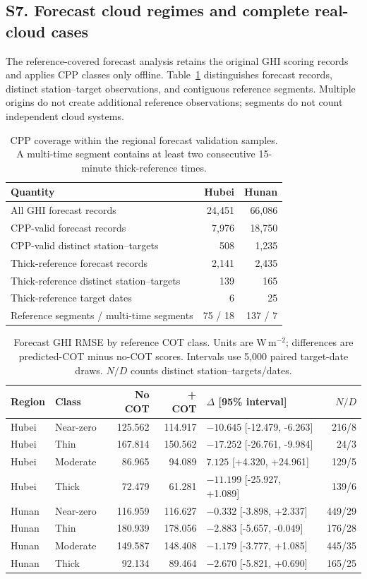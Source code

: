 \documentclass[11pt]{article}
\begin{document}
\subsection*{S7. Forecast cloud regimes and complete real-cloud cases}
The reference-covered forecast analysis retains the original GHI scoring records and applies CPP classes only offline. Table~\ref{tab:forecast_support} distinguishes forecast records, distinct station--target observations, and contiguous reference segments. Multiple origins do not create additional reference observations; segments do not count independent cloud systems.
\begin{table}[!htbp]\centering\small
\caption{CPP coverage within the regional forecast validation samples. A multi-time segment contains at least two consecutive 15-minute thick-reference times.}\label{tab:forecast_support}
\begin{tabularx}{\linewidth}{Xrr}\toprule
Quantity & Hubei & Hunan\\\midrule
All GHI forecast records & 24,451 & 66,086\\
CPP-valid forecast records & 7,976 & 18,750\\
CPP-valid distinct station--targets & 508 & 1,235\\
Thick-reference forecast records & 2,141 & 2,435\\
Thick-reference distinct station--targets & 139 & 165\\
Thick-reference target dates & 6 & 25\\
Reference segments / multi-time segments & 75 / 18 & 137 / 7\\\bottomrule
\end{tabularx}\end{table}
\begin{table}[!htbp]\centering\small
\caption{Forecast GHI RMSE by reference COT class. Units are W\,m$^{-2}$; differences are predicted-COT minus no-COT scores. Intervals use 5,000 paired target-date draws. $N/D$ counts distinct station--targets/dates.}\label{tab:forecast_strata}
\begin{tabularx}{\linewidth}{llrrXr}\toprule
Region & Class & No COT & + COT & $\Delta$ [95\% interval] & $N/D$\\\midrule
Hubei & Near-zero & 125.562 & 114.917 & $-10.645$ [-12.479, -6.263] & 216/8\\
Hubei & Thin & 167.814 & 150.562 & $-17.252$ [-26.761, -9.984] & 24/3\\
Hubei & Moderate & 86.965 & 94.089 & $7.125$ [+4.320, +24.961] & 129/5\\
Hubei & Thick & 72.479 & 61.281 & $-11.199$ [-25.927, +1.089] & 139/6\\
Hunan & Near-zero & 116.959 & 116.627 & $-0.332$ [-3.898, +2.337] & 449/29\\
Hunan & Thin & 180.939 & 178.056 & $-2.883$ [-5.657, -0.049] & 176/28\\
Hunan & Moderate & 149.587 & 148.408 & $-1.179$ [-3.777, +1.085] & 445/35\\
Hunan & Thick & 92.134 & 89.464 & $-2.670$ [-5.821, +0.690] & 165/25\\
\bottomrule\end{tabularx}\end{table}
\end{document}

